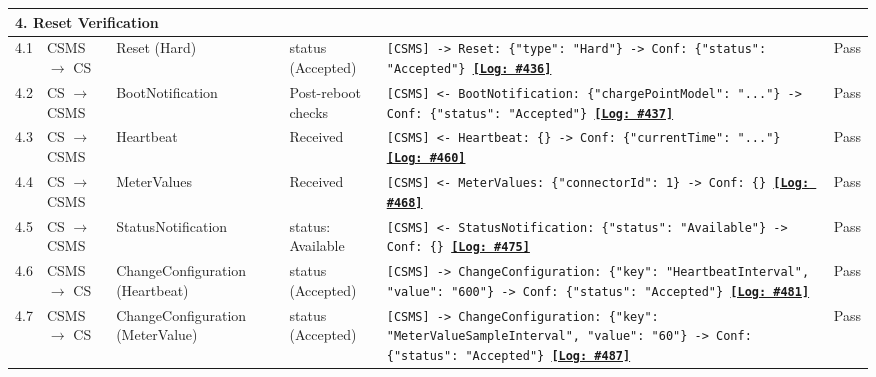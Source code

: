 \documentclass[10pt, a4paper, landscape]{article}
\begin{document}
\begin{longtable}{|p{1.0cm}|p{2.5cm}|p{4.0cm}|p{5.0cm}|p{10.0cm}|c|}
\multicolumn{6}{|l|}{\cellcolor{blue!10}\textbf{4. Reset Verification}} \\
\hline
4.1 & CSMS $\to$ CS & Reset (Hard) & status (Accepted) & \footnotesize\texttt{[CSMS] -> Reset: \{"type": "Hard"\} \newline [CS] -> Conf: \{"status": "Accepted"\} \newline \hyperref[log:4.1]{\textbf{[Log: \#436]}}} & Pass \\
\hline
4.2 & CS $\to$ CSMS & BootNotification & Post-reboot checks & \footnotesize\texttt{[CSMS] <- BootNotification: \{"chargePointModel": "..."\} \newline [CSMS] -> Conf: \{"status": "Accepted"\} \newline \hyperref[log:4.2]{\textbf{[Log: \#437]}}} & Pass \\
\hline
4.3 & CS $\to$ CSMS & Heartbeat & Received & \footnotesize\texttt{[CSMS] <- Heartbeat: \{\} \newline [CSMS] -> Conf: \{"currentTime": "..."\} \newline \hyperref[log:4.3]{\textbf{[Log: \#460]}}} & Pass \\
\hline
4.4 & CS $\to$ CSMS & MeterValues & Received & \footnotesize\texttt{[CSMS] <- MeterValues: \{"connectorId": 1\} \newline [CSMS] -> Conf: \{\} \newline \hyperref[log:4.4]{\textbf{[Log: \#468]}}} & Pass \\
\hline
4.5 & CS $\to$ CSMS & StatusNotification & status: Available & \footnotesize\texttt{[CSMS] <- StatusNotification: \{"status": "Available"\} \newline [CSMS] -> Conf: \{\} \newline \hyperref[log:4.5]{\textbf{[Log: \#475]}}} & Pass \\
\hline
4.6 & CSMS $\to$ CS & ChangeConfiguration (Heartbeat) & status (Accepted) & \footnotesize\texttt{[CSMS] -> ChangeConfiguration: \{"key": "HeartbeatInterval", "value": "600"\} \newline [CS] -> Conf: \{"status": "Accepted"\} \newline \hyperref[log:4.6]{\textbf{[Log: \#481]}}} & Pass \\
\hline
4.7 & CSMS $\to$ CS & ChangeConfiguration (MeterValue) & status (Accepted) & \footnotesize\texttt{[CSMS] -> ChangeConfiguration: \{"key": "MeterValueSampleInterval", "value": "60"\} \newline [CS] -> Conf: \{"status": "Accepted"\} \newline \hyperref[log:4.7]{\textbf{[Log: \#487]}}} & Pass \\

\end{longtable}
\end{document}
